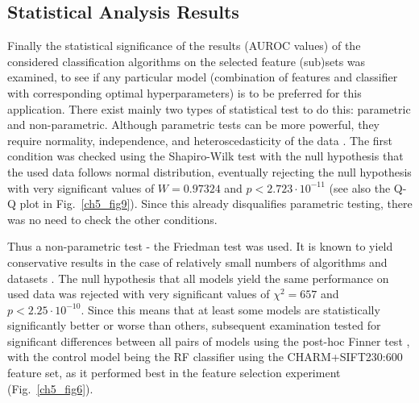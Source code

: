 \subsection{Statistical Analysis Results}
\label{subsec:experimentalAnalysis}
Finally the statistical significance of the results (AUROC values) of the considered classification algorithms on the selected feature (sub)sets was examined, to see if any particular model (combination of features and classifier with corresponding optimal hyperparameters) is to be preferred for this application. There exist mainly two types of statistical test to do this: parametric and non-parametric. Although parametric tests can be more powerful, they require normality, independence, and heteroscedasticity of the data \cite{fernandez2016methodology}. The first condition was checked using the Shapiro-Wilk test \cite{shapiro1965analysis} with the null hypothesis that the used data follows normal distribution, eventually rejecting the null hypothesis with very significant values of $W = 0.97324$ and $p < 2.723 \cdot 10^{-11}$ (see also the Q-Q plot in Fig.~\ref{ch5_fig9}). Since this already disqualifies parametric testing, there was no need to check the other conditions.

Thus a non-parametric test - the Friedman test \cite{friedman1940comparison} was used. It is known to yield conservative results in the case of relatively small numbers of algorithms and datasets \cite{garcia2010advanced}. The null hypothesis that all models yield the same performance on used data was rejected with very significant values of $\chi^2 = 657$ and $p < 2.25 \cdot 10^{-10}$. Since this means that at least some models are statistically significantly better or worse than others, subsequent examination tested for significant differences between all pairs of models using the post-hoc Finner test \cite{finner1993monotonicity}, with the control model being the RF classifier using the CHARM+SIFT230:600 feature set, as it performed best in the feature selection experiment (Fig.~\ref{ch5_fig6}).

